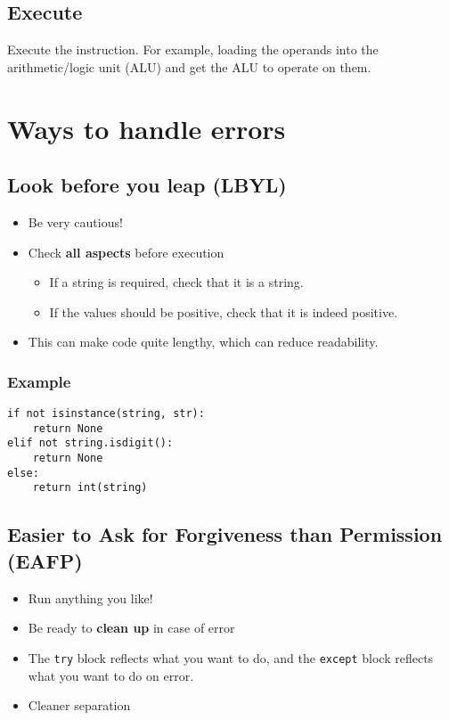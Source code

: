 \documentclass[11pt]{article}
\begin{document}
\subsection{Execute}
\label{sec:org929c83d}
Execute the instruction. For example, loading the operands into the arithmetic/logic unit (ALU) and get the ALU to operate on them.

 \newpage
\section{Ways to handle errors}
\label{sec:orga5160f6}

\subsection{Look before you leap (LBYL)}
\label{sec:orga4a6691}
\begin{itemize}
\item Be very cautious!
\item Check \textbf{all aspects} before execution
\begin{itemize}
\item If a string is required, check that it is a string.
\item If the values should be positive, check that it is indeed positive.
\end{itemize}
\item This can make code quite lengthy, which can reduce readability.
\end{itemize}
\subsubsection{Example}
\label{sec:org8530c59}
\begin{verbatim}
if not isinstance(string, str):
    return None
elif not string.isdigit():
    return None
else:
    return int(string)
\end{verbatim}
\subsection{Easier to Ask for Forgiveness than Permission (EAFP)}
\label{sec:orgc8c59e0}
\begin{itemize}
\item Run anything you like!
\item Be ready to \textbf{clean up} in case of error
\item The \texttt{try} block reflects what you want to do, and the \texttt{except} block reflects what you want to do on error.
\item Cleaner separation
\end{itemize}
\end{document}
